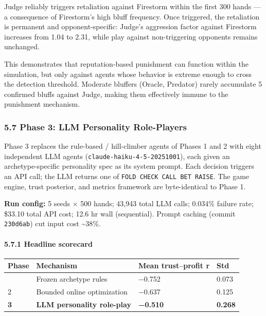 \documentclass[
]{article}
\begin{document}
Judge reliably triggers retaliation against Firestorm within the first
300 hands --- a consequence of Firestorm's high bluff frequency. Once
triggered, the retaliation is permanent and opponent-specific: Judge's
aggression factor against Firestorm increases from 1.04 to 2.31, while
play against non-triggering opponents remains unchanged.

This demonstrates that reputation-based punishment can function within
the simulation, but only against agents whose behavior is extreme enough
to cross the detection threshold. Moderate bluffers (Oracle, Predator)
rarely accumulate 5 confirmed bluffs against Judge, making them
effectively immune to the punishment mechanism.

\hypertarget{phase-3-llm-personality-role-players}{%
\subsubsection{5.7 Phase 3: LLM Personality
Role-Players}\label{phase-3-llm-personality-role-players}}

Phase 3 replaces the rule-based / hill-climber agents of Phases 1 and 2
with eight independent LLM agents (\texttt{claude-haiku-4-5-20251001}),
each given an archetype-specific personality spec as its system prompt.
Each decision triggers an API call; the LLM returns one of
\texttt{FOLD\ CHECK\ CALL\ BET\ RAISE}. The game engine, trust
posterior, and metrics framework are byte-identical to Phase 1.

\textbf{Run config:} 5 seeds × 500 hands; 43,943 total LLM calls;
0.034\% failure rate; \$33.10 total API cost; 12.6 hr wall (sequential).
Prompt caching (commit \texttt{230d6ab}) cut input cost
\textasciitilde38\%.

\hypertarget{headline-scorecard-1}{%
\paragraph{5.7.1 Headline scorecard}\label{headline-scorecard-1}}

\begin{longtable}[]{@{}llll@{}}
\toprule\noalign{}
Phase & Mechanism & Mean trust--profit r & Std \\
\midrule\noalign{}
\endhead
\bottomrule\noalign{}
\endlastfoot
1 & Frozen archetype rules & −0.752 & 0.073 \\
2 & Bounded online optimization & −0.637 & 0.125 \\
\textbf{3} & \textbf{LLM personality role-play} & \textbf{−0.510} &
\textbf{0.268} \\
\end{longtable}
\end{document}
